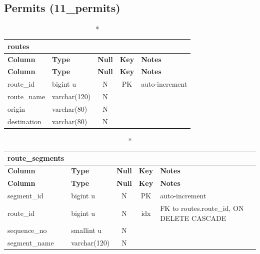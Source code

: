 \subsection*{Permits (11\_permits)}
\begin{longtable}{@{}p{3.4cm}p{2.9cm}c c p{5.6cm}@{}}
\caption*{\textbf{routes}}\\
\toprule \textbf{Column} & \textbf{Type} & \textbf{Null} & \textbf{Key} & \textbf{Notes} \\ \midrule \endfirsthead
\toprule \textbf{Column} & \textbf{Type} & \textbf{Null} & \textbf{Key} & \textbf{Notes} \\ \midrule \endhead
\bottomrule \endlastfoot
route\_\allowbreak{}id & bigint u & N & PK & auto-increment \\
route\_\allowbreak{}name & varchar(120) & N &  &  \\
origin & varchar(80) & N &  &  \\
destination & varchar(80) & N &  &  \\
\end{longtable}
\vspace{-0.4em}
\begin{longtable}{@{}p{3.4cm}p{2.9cm}c c p{5.6cm}@{}}
\caption*{\textbf{route\_\allowbreak{}segments}}\\
\toprule \textbf{Column} & \textbf{Type} & \textbf{Null} & \textbf{Key} & \textbf{Notes} \\ \midrule \endfirsthead
\toprule \textbf{Column} & \textbf{Type} & \textbf{Null} & \textbf{Key} & \textbf{Notes} \\ \midrule \endhead
\bottomrule \endlastfoot
segment\_\allowbreak{}id & bigint u & N & PK & auto-increment \\
route\_\allowbreak{}id & bigint u & N & idx & FK to routes.route\_\allowbreak{}id, ON DELETE CASCADE \\
sequence\_\allowbreak{}no & smallint u & N &  &  \\
segment\_\allowbreak{}name & varchar(120) & N &  &  \\
\end{longtable}
\vspace{-0.4em}
